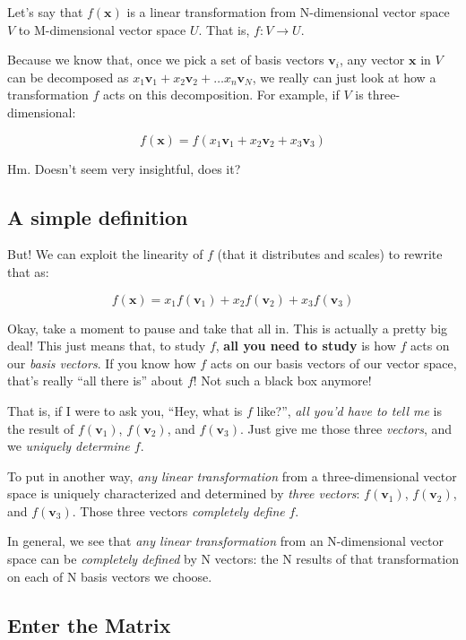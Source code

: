 \documentclass[]{article}
\begin{document}
Let's say that \(f(\mathbf{x})\) is a linear transformation from N-dimensional
vector space \(V\) to M-dimensional vector space \(U\). That is, \(f : V
\rightarrow U\).

Because we know that, once we pick a set of basis vectors \(\mathbf{v}_i\), any
vector \(\mathbf{x}\) in \(V\) can be decomposed as \(x_1 \mathbf{v}_1 + x_2
\mathbf{v}_2 + \ldots x_n \mathbf{v}_N\), we really can just look at how a
transformation \(f\) acts on this decomposition. For example, if \(V\) is
three-dimensional:

\[
f(\mathbf{x}) = f(x_1 \mathbf{v}_1 + x_2 \mathbf{v}_2 + x_3 \mathbf{v}_3)
\]

Hm. Doesn't seem very insightful, does it?

\subsection{A simple definition}\label{a-simple-definition}

But! We can exploit the linearity of \(f\) (that it distributes and scales) to
rewrite that as:

\[
f(\mathbf{x}) = x_1 f(\mathbf{v}_1) + x_2 f(\mathbf{v}_2) + x_3 f(\mathbf{v}_3)
\]

Okay, take a moment to pause and take that all in. This is actually a pretty big
deal! This just means that, to study \(f\), \textbf{all you need to study} is
how \(f\) acts on our \emph{basis vectors}. If you know how \(f\) acts on our
basis vectors of our vector space, that's really ``all there is'' about \(f\)!
Not such a black box anymore!

That is, if I were to ask you, ``Hey, what is \(f\) like?'', \emph{all you'd
have to tell me} is the result of \(f(\mathbf{v}_1)\), \(f(\mathbf{v}_2)\), and
\(f(\mathbf{v}_3)\). Just give me those three \emph{vectors}, and we
\emph{uniquely determine \(f\)}.

To put in another way, \emph{any linear transformation} from a three-dimensional
vector space is uniquely characterized and determined by \emph{three vectors}:
\(f(\mathbf{v}_1)\), \(f(\mathbf{v}_2)\), and \(f(\mathbf{v}_3)\). Those three
vectors \emph{completely define} \(f\).

In general, we see that \emph{any linear transformation} from an N-dimensional
vector space can be \emph{completely defined} by N vectors: the N results of
that transformation on each of N basis vectors we choose.

\subsection{Enter the Matrix}\label{enter-the-matrix}
\end{document}
